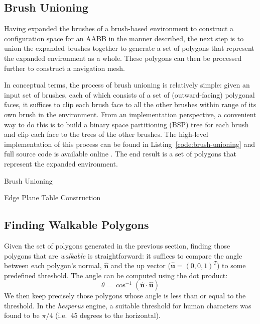 \documentclass[10pt,twocolumn]{article}
\begin{document}
\subsection{Brush Unioning}

Having expanded the brushes of a brush-based environment to construct a configuration space for an AABB in the manner described, the next step is to union the expanded brushes together to generate a set of polygons that represent the expanded environment as a whole. These polygons can then be processed further to construct a navigation mesh.

In conceptual terms, the process of brush unioning is relatively simple: given an input set of brushes, each of which consists of a set of (outward-facing) polygonal faces, it suffices to clip each brush face to all the other brushes within range of its own brush in the environment. From an implementation perspective, a convenient way to do this is to build a binary space partitioning (BSP) tree for each brush and clip each face to the trees of the other brushes. The high-level implementation of this process can be found in Listing~\ref{code:brush-unioning} and full source code is available online \cite{hesperus}. The end result is a set of polygons that represent the expanded environment.

\begin{stulisting}[t]
\caption{Brush Unioning}
\label{code:brush-unioning}

\end{stulisting}

\begin{stulisting}[t]
\caption{Edge Plane Table Construction}
\label{code:ept-construction}

\end{stulisting}

\subsection{Finding Walkable Polygons}

Given the set of polygons generated in the previous section, finding those polygons that are \emph{walkable} is straightforward: it suffices to compare the angle between each polygon's normal, $\mathbf{\hat{n}}$ and the up vector ($\mathbf{\hat{u}} = (0,0,1)^T$) to some predefined threshold. The angle can be computed using the dot product:
%
\[
\theta = \cos^{-1} \left( \mathbf{\hat{n}} \cdot \mathbf{\hat{u}} \right)
\]
%
We then keep precisely those polygons whose angle is less than or equal to the threshold. In the \emph{hesperus} engine, a suitable threshold for human characters was found to be $\pi/4$ (i.e.~45 degrees to the horizontal).
\end{document}
